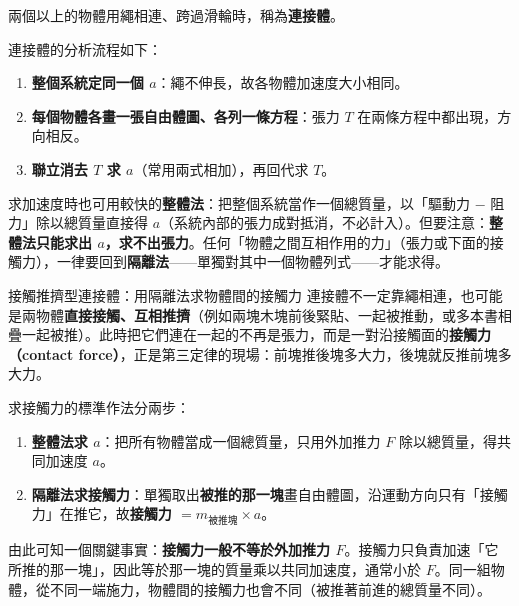 \documentclass[11pt]{article}
\begin{document}
兩個以上的物體用繩相連、跨過滑輪時，稱為\textbf{連接體}。


連接體的分析流程如下：
\begin{enumerate}\setlength{\itemsep}{1pt}
\item \textbf{整個系統定同一個 $a$}：繩不伸長，故各物體加速度大小相同。
\item \textbf{每個物體各畫一張自由體圖、各列一條方程}：張力 $T$ 在兩條方程中都出現，方向相反。
\item \textbf{聯立消去 $T$ 求 $a$}（常用兩式相加），再回代求 $T$。
\end{enumerate}

求加速度時也可用較快的\textbf{整體法}：把整個系統當作一個總質量，以「驅動力 $-$ 阻力」除以總質量直接得 $a$（系統內部的張力成對抵消，不必計入）。但要注意：\textbf{整體法只能求出 $a$，求不出張力}。任何「物體之間互相作用的力」（張力或下面的接觸力），一律要回到\textbf{隔離法}——單獨對其中一個物體列式——才能求得。

\begin{補充框}{接觸推擠型連接體：用隔離法求物體間的接觸力}
連接體不一定靠繩相連，也可能是兩物體\textbf{直接接觸、互相推擠}（例如兩塊木塊前後緊貼、一起被推動，或多本書相疊一起被推）。此時把它們連在一起的不再是張力，而是一對沿接觸面的\textbf{接觸力（contact force）}，正是第三定律的現場：前塊推後塊多大力，後塊就反推前塊多大力。

求接觸力的標準作法分兩步：
\begin{enumerate}\setlength{\itemsep}{1pt}
\item \textbf{整體法求 $a$}：把所有物體當成一個總質量，只用外加推力 $F$ 除以總質量，得共同加速度 $a$。
\item \textbf{隔離法求接觸力}：單獨取出\textbf{被推的那一塊}畫自由體圖，沿運動方向只有「接觸力」在推它，故\textbf{接觸力 $=m_{\text{被推塊}}\times a$}。
\end{enumerate}


由此可知一個關鍵事實：\textbf{接觸力一般不等於外加推力 $F$}。接觸力只負責加速「它所推的那一塊」，因此等於那一塊的質量乘以共同加速度，通常小於 $F$。同一組物體，從不同一端施力，物體間的接觸力也會不同（被推著前進的總質量不同）。
\end{補充框}
\end{document}
